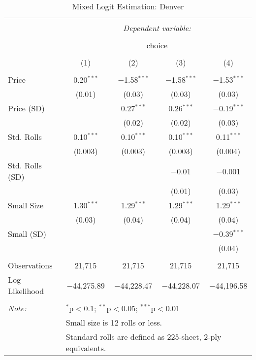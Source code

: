 
\begin{table}[!htbp] \centering 
  \caption{Mixed Logit Estimation: Denver} 
  \label{tab:mnlDenverRandCoefNoObsHet} 
\begin{tabular}{@{\extracolsep{5pt}}lcccc} 
\\[-1.8ex]\hline 
\hline \\[-1.8ex] 
 & \multicolumn{4}{c}{\textit{Dependent variable:}} \\ 
\cline{2-5} 
\\[-1.8ex] & \multicolumn{4}{c}{choice} \\ 
\\[-1.8ex] & (1) & (2) & (3) & (4)\\ 
\hline \\[-1.8ex] 
 Price & 0.20$^{***}$ & $-$1.58$^{***}$ & $-$1.58$^{***}$ & $-$1.53$^{***}$ \\ 
  & (0.01) & (0.03) & (0.03) & (0.03) \\ 
  Price (SD) &  & 0.27$^{***}$ & 0.26$^{***}$ & $-$0.19$^{***}$ \\ 
  &  & (0.02) & (0.02) & (0.03) \\ 
  Std. Rolls & 0.10$^{***}$ & 0.10$^{***}$ & 0.10$^{***}$ & 0.11$^{***}$ \\ 
  & (0.003) & (0.003) & (0.003) & (0.004) \\ 
  Std. Rolls (SD) &  &  & $-$0.01 & $-$0.001 \\ 
  &  &  & (0.01) & (0.03) \\ 
  Small Size & 1.30$^{***}$ & 1.29$^{***}$ & 1.29$^{***}$ & 1.29$^{***}$ \\ 
  & (0.03) & (0.04) & (0.04) & (0.04) \\ 
  Small (SD) &  &  &  & $-$0.39$^{***}$ \\ 
  &  &  &  & (0.04) \\ 
 \hline \\[-1.8ex] 
Observations & 21,715 & 21,715 & 21,715 & 21,715 \\ 
Log Likelihood & $-$44,275.89 & $-$44,228.47 & $-$44,228.07 & $-$44,196.58 \\ 
\hline 
\hline \\[-1.8ex] 
\textit{Note:}  & \multicolumn{4}{l}{$^{*}$p$<$0.1; $^{**}$p$<$0.05; $^{***}$p$<$0.01} \\ 
 & \multicolumn{4}{l}{Small size is 12 rolls or less.} \\ 
 & \multicolumn{4}{l}{Standard rolls are defined as 225-sheet, 2-ply equivalents.} \\ 
\end{tabular} 
\end{table} 

